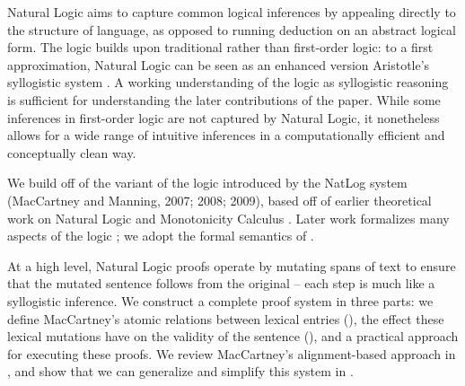 Natural Logic aims to capture common logical
  inferences by appealing directly to the structure of language,
  as opposed to running deduction on an abstract logical form.
The logic builds upon traditional rather than first-order logic:
  to a first approximation, Natural Logic can be seen as
  an enhanced version Aristotle's syllogistic system
  \cite{key:2008vanbenthem-natlog}.
A working understanding of the logic as syllogistic reasoning
  is sufficient for understanding the later contributions of the paper.
While some inferences in first-order logic are not captured by 
  Natural Logic,
  it nonetheless allows for a wide range of intuitive inferences in
  a computationally efficient and conceptually clean way.

We build off of the variant of the logic introduced by
  the NatLog system (MacCartney and Manning, 2007; 2008; 2009),
  \nocite{key:2007maccartney-natlog}
  \nocite{key:2008maccartney-natlog}
  \nocite{key:2009maccartney-natlog}
  based off of earlier theoretical work on Natural Logic and 
  Monotonicity Calculus
  \cite{key:1986benthem-natlog,key:1991valencia-natlog}.
Later work formalizes many aspects of the logic
  \cite{key:2012icard-natlog,key:2013djalali-natlog};
  we adopt the formal semantics of
  .

At a high level, Natural Logic proofs operate by mutating spans of text
  to ensure that the mutated sentence follows from the
  original -- each step is much like a syllogistic inference.
We construct a complete proof system in three parts:
  we define MacCartney's atomic relations between lexical entries
  (), the effect these lexical mutations have
  on the validity of the sentence (),
  and a practical approach for executing these proofs.
We review MacCartney's alignment-based approach in
  , and show that we can generalize and
  simplify this system in .

